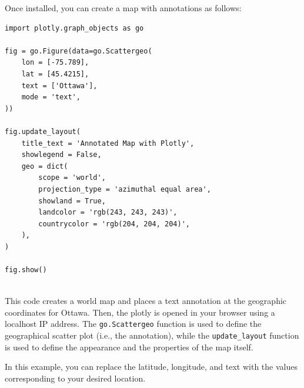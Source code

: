 Once installed, you can create a map with annotations as follows:


\begin{verbatim}
import plotly.graph_objects as go

fig = go.Figure(data=go.Scattergeo(
    lon = [-75.789], 
    lat = [45.4215],
    text = ['Ottawa'],
    mode = 'text',
))

fig.update_layout(
    title_text = 'Annotated Map with Plotly',
    showlegend = False,
    geo = dict(
        scope = 'world',
        projection_type = 'azimuthal equal area',
        showland = True,
        landcolor = 'rgb(243, 243, 243)',
        countrycolor = 'rgb(204, 204, 204)',
    ),
)

fig.show()


\end{verbatim}
This code creates a world map and places a text annotation at the
geographic coordinates for Ottawa. Then, the plotly is opened in your browser using a localhost IP address. 
The \texttt{go.Scattergeo} function is
used to define the geographical scatter plot (i.e., the annotation),
while the \texttt{update\_layout} function is used to define the appearance
and the properties of the map itself.

In this example, you can replace the latitude, longitude, and text
with the values corresponding to your desired location.
